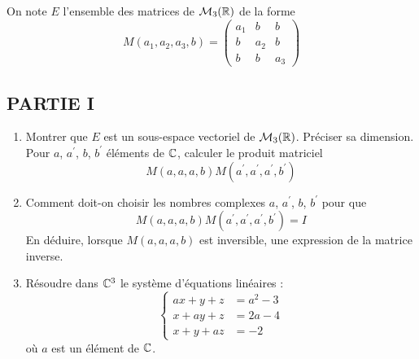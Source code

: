 On note $E$ l'ensemble des matrices de $\mathcal M _3 (\mathbb{R})$ de la forme 
\begin{displaymath}
 M(a_1,a_2,a_3,b) = 
\begin{pmatrix}
 a_1 & b & b \\
 b & a_2 & b \\
 b & b & a_3
\end{pmatrix}
\end{displaymath}

\subsection*{PARTIE I}
\begin{enumerate}
 \item Montrer que $E$ est un sous-espace vectoriel de $\mathcal M _3 (\mathbb{R})$. Préciser sa dimension. Pour $a$, $a^\prime$, $b$, $b^\prime$ éléments de $\mathbb{C}$, calculer le produit matriciel
\begin{displaymath}
 M(a,a,a,b) M(a^\prime,a^\prime,a^\prime,b^\prime)
\end{displaymath}
\item Comment doit-on choisir les nombres complexes $a$, $a^\prime$, $b$, $b^\prime$ pour que 
\begin{displaymath}
 M(a,a,a,b) M(a^\prime,a^\prime,a^\prime,b^\prime) = I
\end{displaymath}
En déduire, lorsque $M(a,a,a,b)$ est inversible, une expression de la matrice inverse.
\item Résoudre dans $\mathbb{C}^3$ le système d'équations linéaires :
\begin{displaymath}
 \left\lbrace 
\begin{aligned}
 ax + y + z &= a^2 -3 \\
x + ay + z &= 2a -4 \\
x + y + az &=-2
\end{aligned}
\right. 
\end{displaymath}
où $a$ est un élément de $\mathbb{C}$.
\end{enumerate}


